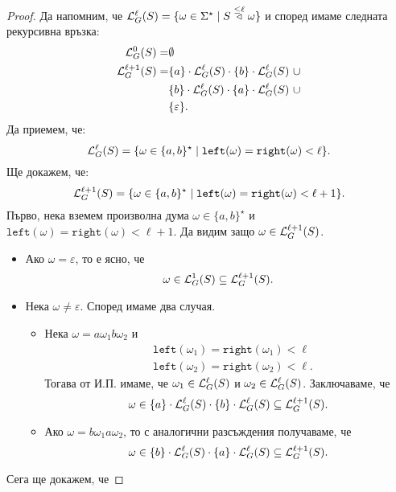 \begin{proof}
  Да напомним, че $\mathcal{L}^\ell_G(S) = \{\omega \in \Sigma^\star \mid S \stackrel{{\leq \ell}}{\triangleleft} \omega\}$
  и според  имаме следната рекурсивна връзка:
  \begin{align*}
    \mathcal{L}^0_G(S) = & \emptyset\\
    \mathcal{L}^{\ell+1}_G(S) = & \{a\} \cdot \mathcal{L}^\ell_G(S) \cdot \{b\} \cdot \mathcal{L}^\ell_G(S)\ \cup\\
                & \{b\} \cdot \mathcal{L}^\ell_G(S) \cdot \{a\} \cdot \mathcal{L}^\ell_G(S)\ \cup\\
                & \{\varepsilon\}.
  \end{align*}
  Да приемем, че:
  \[\mathcal{L}^\ell_G(S) = \{\omega \in \{a,b\}^\star \mid \texttt{left}(\omega) = \texttt{right}(\omega) < \ell \}.\]
  Ще докажем, че:
  \[\mathcal{L}^{\ell+1}_G(S) = \{\omega \in \{a,b\}^\star \mid \texttt{left}(\omega) = \texttt{right}(\omega) < \ell+1 \}.\]
  Първо, нека вземем произволна дума $\omega \in \{a,b\}^\star$ и $\texttt{left}(\omega) = \texttt{right}(\omega) < \ell+1$.
  Да видим защо $\omega \in \mathcal{L}^{\ell+1}_G(S)$.
  \begin{itemize}
  \item 
    Ако $\omega = \varepsilon$, то е ясно, че
    \[\omega \in \mathcal{L}^1_G(S) \subseteq \mathcal{L}^{\ell+1}_G(S).\]
  \item
    Нека $\omega \neq \varepsilon$. Според  имаме два случая.
    \begin{itemize}
    \item
      Нека $\omega = a \omega_1 b \omega_2$ и
      \begin{align*}
        & \texttt{left}(\omega_1) = \texttt{right}(\omega_1) < \ell\\
        & \texttt{left}(\omega_2) = \texttt{right}(\omega_2) < \ell.
      \end{align*}
      Тогава от И.П. имаме, че $\omega_1 \in \mathcal{L}^\ell_G(S)$ и $\omega_2 \in \mathcal{L}^\ell_G(S)$. Заключаваме, че
      \[\omega \in \{a\} \cdot \mathcal{L}^\ell_G(S) \cdot \{b\} \cdot \mathcal{L}^\ell_G(S) \subseteq \mathcal{L}^{\ell+1}_G(S).\]
    \item
      Ако $\omega = b \omega_1 a \omega_2$, то с аналогични разсъждения получаваме, че
      \[\omega \in \{b\} \cdot \mathcal{L}^\ell_G(S) \cdot \{a\} \cdot \mathcal{L}^\ell_G(S) \subseteq \mathcal{L}^{\ell+1}_G(S).\]
    \end{itemize}
  \end{itemize}
  Сега ще докажем, че 

\end{proof}
